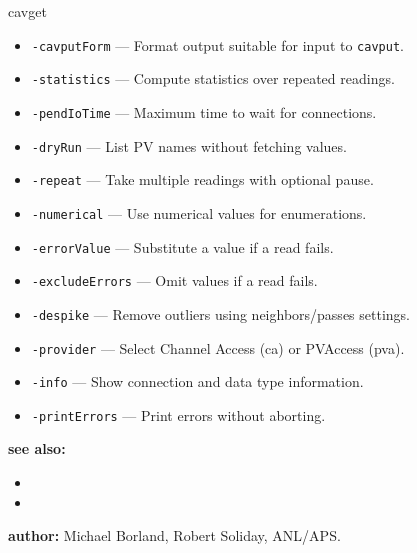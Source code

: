 \begin{sddsprog}{cavget}
\begin{itemize}
  \item {\tt -cavputForm} --- Format output suitable for input to \verb+cavput+.
  \item {\tt -statistics} --- Compute statistics over repeated readings.
  \item {\tt -pendIoTime} --- Maximum time to wait for connections.
  \item {\tt -dryRun} --- List PV names without fetching values.
  \item {\tt -repeat} --- Take multiple readings with optional pause.
  \item {\tt -numerical} --- Use numerical values for enumerations.
  \item {\tt -errorValue} --- Substitute a value if a read fails.
  \item {\tt -excludeErrors} --- Omit values if a read fails.
  \item {\tt -despike} --- Remove outliers using neighbors/passes settings.
  \item {\tt -provider} --- Select Channel Access (ca) or PVAccess (pva).
  \item {\tt -info} --- Show connection and data type information.
  \item {\tt -printErrors} --- Print errors without aborting.
\end{itemize}
\item \textbf{see also:}
\begin{itemize}
  \item {}
  \item {}
\end{itemize}
\item \textbf{author:} Michael Borland, Robert Soliday, ANL/APS.
\end{sddsprog}
